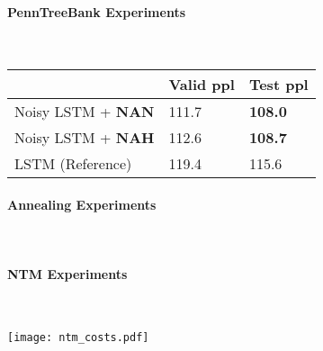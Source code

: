 \documentclass[potrait,a0paper,fontscale=0.285,final]{baposter} %
\begin{document}
\begin{poster}
{\paragraph{PennTreeBank Experiments} \mbox{} \\
\begin{minipage}[t]{0.96\linewidth}
    \centering
    \begin{tabular}{@{}lll@{}}
        \toprule
                                           & Valid  ppl & Test  ppl      \\ \midrule
        Noisy LSTM + \textbf{NAN}      & 111.7      & \textbf{108.0} \\
        Noisy LSTM + \textbf{NAH} & 112.6      & \textbf{108.7} \\
        LSTM (Reference)                   & 119.4      & 115.6          \\ \bottomrule
    \end{tabular}
\end{minipage}

\paragraph{Annealing Experiments} \mbox{}\\
\paragraph{NTM Experiments} \mbox{}\\
\begin{minipage}{0.79\linewidth}
    \centering
    \texttt{[image: ntm\_costs.pdf]}
\end{minipage} \mbox{}\\
}


\end{poster}
\end{document}

